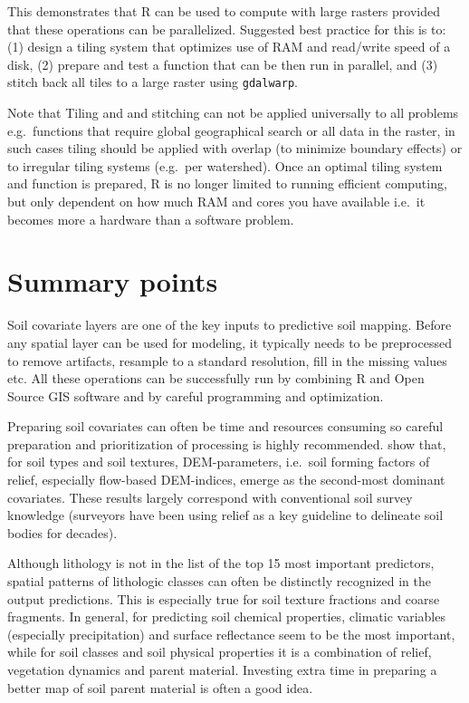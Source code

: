 \documentclass[graybox,natbib,nospthms,UStrade]{svmono}
\begin{document}
This demonstrates that R can be used to compute with large rasters provided that these operations can be parallelized. Suggested best practice for this is to: (1) design a tiling system that optimizes use of RAM and read/write speed of a disk, (2) prepare and test a function that can be then run in parallel, and (3) stitch back all tiles to a large raster using \texttt{gdalwarp}.

Note that Tiling and and stitching can not be applied universally to all problems e.g.~functions that require global geographical search or all data in the raster, in such cases tiling should be applied with overlap (to minimize boundary effects) or to irregular tiling systems (e.g.~per watershed). Once an optimal tiling system and function is prepared, R is no longer limited to running efficient computing, but only dependent on how much RAM and cores you have available i.e.~it becomes more a hardware than a software problem.

\hypertarget{summary-points-1}{%
\section{Summary points}\label{summary-points-1}}

Soil covariate layers are one of the key inputs to predictive soil mapping.
Before any spatial layer can be used for modeling, it typically needs to be
preprocessed to remove artifacts, resample to a standard resolution, fill in the
missing values etc. All these operations can be successfully run by combining R
and Open Source GIS software and by careful programming and optimization.

Preparing soil covariates can often be time and resources consuming so careful
preparation and prioritization of processing is highly recommended.
\citet{Hengl2017SoilGrids250m} show that, for soil types and soil textures, DEM-parameters,
i.e.~soil forming factors of relief, especially flow-based DEM-indices,
emerge as the second-most dominant covariates. These results largely
correspond with conventional soil survey knowledge (surveyors have been
using relief as a key guideline to delineate soil bodies for decades).

Although lithology is not in the list of the top 15 most important
predictors, spatial patterns of lithologic classes can often be
distinctly recognized in the output predictions. This is especially true
for soil texture fractions and coarse fragments. In general, for
predicting soil chemical properties, climatic variables (especially
precipitation) and surface reflectance seem to be the most important,
while for soil classes and soil physical properties it is a combination
of relief, vegetation dynamics and parent material. Investing extra time
in preparing a better map of soil parent material is often a good idea.
\end{document}
